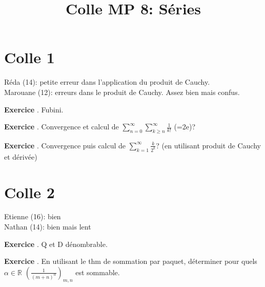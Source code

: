 \documentclass[10pt,a4paper]{article}
\title{Colle MP 8: Séries}
\newcounter{question}
\newcounter{exo}
\newenvironment{exo}{\vspace{0.5cm}\setcounter{question}{0}\addtocounter{exo}{1} \noindent \textbf{Exercice \theexo}. \normalsize }{\par}
\begin{document}
	\maketitle
	
	\section*{Colle 1}
	
	Réda (14): petite erreur dans l'application du produit de Cauchy.\\
	Marouane (12): erreurs dans le produit de Cauchy. Assez bien mais confus.\\
	
	\begin{exo}
		Fubini.
	\end{exo}
	
	\begin{exo}
		Convergence et calcul de $\sum_{n=0}^{\infty} \sum_{k\geq n}^{\infty} \frac{1}{k!}$ (=2e)? 
	\end{exo}

\begin{exo}
	Convergence puis calcul de $\sum_{k=1}^{\infty} \frac{k}{2^k}$? (en utilisant produit de Cauchy et dérivée)
\end{exo}
	
	\section*{Colle 2}
	\setcounter{exo}{0}
	Etienne (16): bien\\
	Nathan (14): bien mais lent\\
	
	\begin{exo}
		Q et D dénombrable.
	\end{exo}

	\begin{exo}
		En utilisant le thm de sommation par paquet, déterminer pour quels $\alpha \in \mathbb{R}$ $(\frac{1}{(m+n)^\alpha})_{m, n}$ est sommable.
	\end{exo}
	
	
\end{document}
